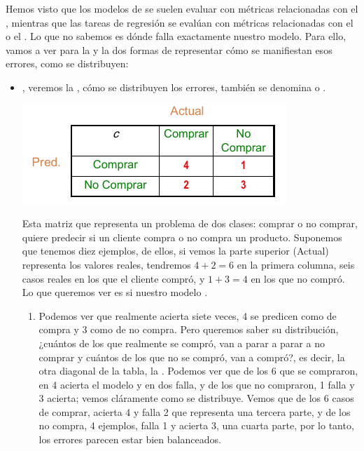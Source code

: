 Hemos visto que los modelos de  se suelen evaluar con métricas relacionadas con el , mientras que las tareas de regresión se evalúan con métricas relacionadas con el  o el . Lo que no sabemos es dónde falla exactamente nuestro modelo. Para ello, vamos a ver para la  y la  dos formas de representar cómo se manifiestan esos errores, como se distribuyen:
\begin{itemize}
    \item {}, veremos la , cómo se distribuyen los errores, también se denomina  o .
    \begin{center}
        \includegraphics[scale=.67]{images/mod02-09.png}
    \end{center}
    Esta matriz que representa un problema de dos clases: comprar o no comprar, quiere predecir si un cliente compra o no compra un producto. Suponemos que tenemos diez ejemplos, de ellos, si vemos la parte superior (Actual) representa los valores reales, tendremos $4+2=6$ en la primera columna, seis casos reales en los que el cliente compró, y $1+3=4$ en los que no compró. Lo que queremos ver es si nuestro modelo .
    \begin{enumerate}
        \item Podemos ver que realmente acierta siete veces, 4 se predicen como de compra y 3 como de no compra. Pero queremos saber su distribución, ¿cuántos de los que realmente se compró, van a parar a parar a no comprar y cuántos de los que no se compró, van a compró?, es decir, la otra diagonal de la tabla, la . Podemos ver que de los 6 que se compraron, en 4 acierta el modelo y en dos falla, y de los que no compraron, 1 falla y 3 acierta; vemos cláramente como se distribuye. Vemos que de los 6 casos de comprar, acierta 4 y falla 2 que representa una tercera parte, y de los no compra, 4 ejemplos, falla 1 y acierta 3, una cuarta parte, por lo tanto, los errores parecen estar bien balanceados.
    \end{enumerate}

\end{itemize}
